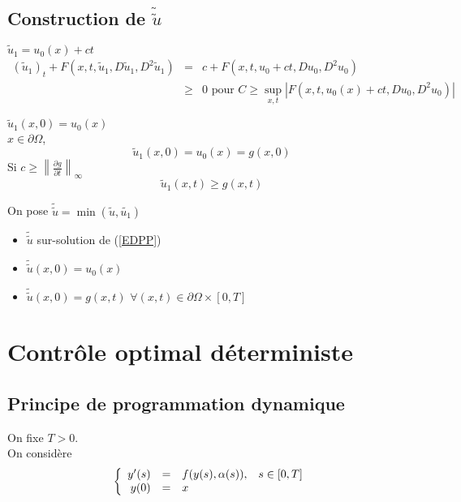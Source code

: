 
\subsection{Construction de $\tilde{\tilde{u}}$}
$\tilde{u}_1=u_0(x)+ct$
\begin{eqnarray*}
(\tilde{u}_1)_t+F(x,t,\tilde{u}_1,D\tilde{u}_1,D^2\tilde{u}_1)&=&c+F(x,t,u_0+ct,Du_0,D^2u_0)\\
			&\geq&0 \text{ pour } C\geq\sup_{x,t}|F(x,t,u_0(x)+ct,Du_0,D^2u_0)|
\end{eqnarray*}

$\tilde{u}_1(x,0)=u_0(x)$\\
$x\in\partial\Omega$, \[\tilde{u}_1(x,0)=u_0(x)=g(x,0)\]
Si $c\geq\left\| \frac{\partial g}{\partial t}\right\|_\infty$
	\[\tilde{u}_1(x,t)\geq g(x,t)\]

On pose $\tilde{\tilde{u}}=\min(\tilde{u}, \tilde{u_1})$
\begin{itemize}
	\item $\tilde{\tilde{u}}$ sur-solution de (\ref{EDPP})
	\item $\tilde{\tilde{u}}(x,0)=u_0(x)$
	\item $\tilde{\tilde{u}}(x,0)=g(x,t)$ $\forall(x,t)\in\partial\Omega\times[0,T]$
\end{itemize}

\section{Contrôle optimal déterministe}
\subsection{Principe de programmation dynamique}
On fixe $T>0$.\\
On considère
\[\left\{\begin{array}{r c l c}
	y'(s)&=&f(y(s),\alpha(s)), & s\in[0,T]\\
	y(0)&=&x
\end{array}\right.\]

